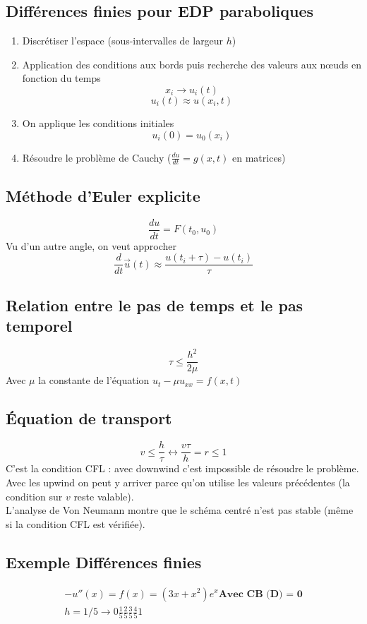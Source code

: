 \documentclass[resume]{subfiles}
\begin{document}
\subsection{Différences finies pour EDP paraboliques}
\begin{enumerate}
\item Discrétiser l'espace (sous-intervalles de largeur $h$)
\item Application des conditions aux bords puis recherche des valeurs aux nœuds en fonction du temps
$$x_i\to u_i(t)$$
$$u_i(t)\approx u(x_i,t)$$
\item On applique les conditions initiales
$$u_i(0)=u_0(x_i)$$
\item Résoudre le problème de Cauchy ($\frac{du}{dt}=g(x,t)$ en matrices)
\end{enumerate}
\subsection{Méthode d'Euler explicite}
$$\frac{du}{dt}=F(t_0,u_0)$$
Vu d'un autre angle, on veut approcher
$$\frac{d}{dt}\vec{u}(t)\approx \frac{u(t_i+\tau)-u(t_i)}{\tau}$$
\subsection{Relation entre le pas de temps et le pas temporel}
$$\tau\leq \frac{h^2}{2\mu}$$
Avec $\mu$ la constante de l'équation $u_t-\mu u_{xx}=f(x,t)$
\subsection{Équation de transport}
$$v\leq \frac{h}{\tau}\longleftrightarrow \frac{v\tau}{h}=r\leq 1$$
C'est la condition CFL : avec downwind c'est impossible de résoudre le problème. Avec les upwind on peut y arriver parce qu'on utilise les valeurs précédentes (la condition sur $v$ reste valable).\\
L'analyse de Von Neumann montre que le schéma centré n'est pas stable (même si la condition CFL est vérifiée).

\subsection{Exemple Différences finies}
\begin{align*} %
-u''(x) = f(x) = (3x+x^2)e^x \textbf{Avec CB (D) = 0}\\
h=1/5 \rightarrow 0 \frac{1}{5} \frac{2}{5} \frac{3}{5} \frac{4}{5} 1

\end{align*}
\end{document}
